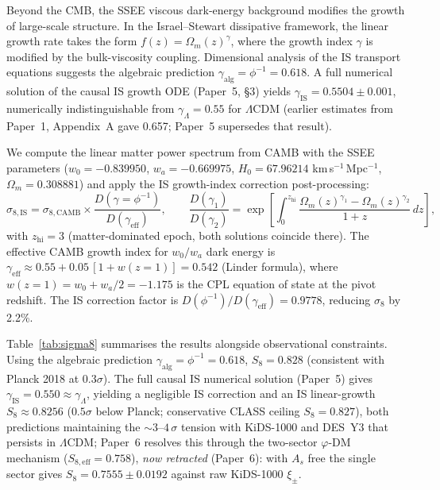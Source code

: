 \documentclass[12pt,a4paper]{article}
\begin{document}
Beyond the CMB, the SSEE viscous dark-energy background modifies the growth
of large-scale structure. In the Israel--Stewart dissipative framework, the
linear growth rate takes the form $f(z) = \Omega_m(z)^\gamma$, where the
growth index $\gamma$ is modified by the bulk-viscosity coupling.
Dimensional analysis of the IS transport equations suggests the algebraic
prediction $\gamma_\mathrm{alg} = \phi^{-1} = 0.618$.  A full numerical
solution of the causal IS growth ODE (Paper~5, \S3) yields
$\gamma_{\mathrm{IS}} = 0.5504\pm0.001$, numerically indistinguishable from
$\gamma_\Lambda=0.55$ for $\Lambda$CDM (earlier estimates from Paper~1,
Appendix~A gave 0.657; Paper~5 supersedes that result).

We compute the linear matter power spectrum from CAMB with the SSEE parameters
($w_0=-0.839950$, $w_a=-0.669975$, $H_0=67.96214$ km\,s$^{-1}$\,Mpc$^{-1}$,
$\Omega_m=0.308881$) and apply the IS growth-index correction post-processing:
\begin{equation}
  \sigma_{8,\mathrm{IS}} = \sigma_{8,\mathrm{CAMB}} \times
    \frac{D(\gamma=\phi^{-1})}{D(\gamma_\mathrm{eff})} ,
  \qquad
  \frac{D(\gamma_1)}{D(\gamma_2)} = \exp\!\left[
    \int_0^{z_\mathrm{hi}} \frac{\Omega_m(z)^{\gamma_1} - \Omega_m(z)^{\gamma_2}}{1+z}\,dz
  \right] ,
\end{equation}
with $z_\mathrm{hi}=3$ (matter-dominated epoch, both solutions coincide there).
The effective CAMB growth index for $w_0/w_a$ dark energy is
$\gamma_\mathrm{eff} \approx 0.55 + 0.05\,[1+w(z{=}1)] = 0.542$
(Linder formula), where $w(z{=}1)=w_0+w_a/2=-1.175$ is the CPL equation of
state at the pivot redshift.
The IS correction factor is $D(\phi^{-1})/D(\gamma_\mathrm{eff}) = 0.9778$,
reducing $\sigma_8$ by 2.2\%.

Table~\ref{tab:sigma8} summarises the results alongside observational constraints.
Using the algebraic prediction $\gamma_\mathrm{alg}=\phi^{-1}=0.618$,
$S_8=0.828$ (consistent with Planck 2018 at $0.3\sigma$).
The full causal IS numerical solution (Paper~5) gives
$\gamma_\mathrm{IS}=0.550\approx\gamma_\Lambda$, yielding a negligible IS
correction and an IS linear-growth $S_8\approx0.8256$ ($0.5\sigma$ below Planck;
conservative CLASS ceiling $S_8=0.827$),
both predictions maintaining the $\sim 3\text{--}4\,\sigma$ tension with KiDS-1000
and DES~Y3 that persists in $\Lambda$CDM; Paper~6 resolves this through the
two-sector $\varphi$-DM mechanism ($S_{8,\mathrm{eff}}=0.758$), \emph{now retracted} (Paper~6): with $A_s$ free the single sector gives $S_8=0.7555\pm0.0192$ against raw KiDS-1000 $\xi_\pm$.
\end{document}
